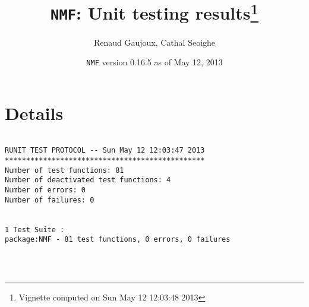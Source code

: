 \documentclass[10pt]{article}
\author{Renaud Gaujoux, Cathal Seoighe}
\title{\texttt{NMF}: Unit testing results\footnote{Vignette computed  on Sun May 12 12:03:48 2013}}
\date{\texttt{NMF} version 0.16.5 as of May 12, 2013}
\begin{document}
\maketitle

\section{Details}
\begin{verbatim}

RUNIT TEST PROTOCOL -- Sun May 12 12:03:47 2013 
*********************************************** 
Number of test functions: 81 
Number of deactivated test functions: 4 
Number of errors: 0 
Number of failures: 0 

 
1 Test Suite : 
package:NMF - 81 test functions, 0 errors, 0 failures




\end{verbatim}
\end{document}
